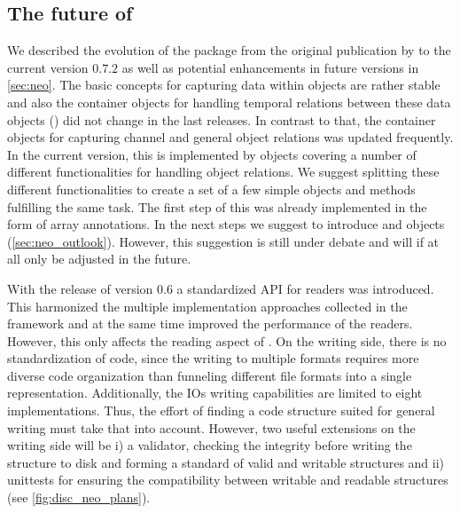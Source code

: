 \subsection{The future of }
We described the evolution of the  package from the original publication by \citet{Garcia_2014} to the current version $0.7.2$ as well as potential enhancements in future versions in \cref{sec:neo}. The basic concepts for capturing data within  objects are rather stable and also the  container objects for handling temporal relations between these data objects () did not change in the last releases. In contrast to that, the container objects for capturing channel and general object relations was updated frequently. In the current  version, this is implemented by  objects covering a number of different functionalities for handling object relations. We suggest splitting these different functionalities to create a set of a few simple objects and methods fulfilling the same task. The first step of this was already implemented in the form of array annotations. In the next steps we suggest to introduce  and  objects (\cref{sec:neo_outlook}). However, this suggestion is still under debate and will if at all only be adjusted in the future. 

With the release of  version $0.6$ a standardized API for readers was introduced. This harmonized the multiple implementation approaches collected in the  framework and at the same time improved the performance of the readers. However, this only affects the reading aspect of . On the writing side, there is no standardization of code, since the writing to multiple formats requires more diverse code organization than funneling different file formats into a single representation. Additionally,  the IOs writing capabilities are limited to eight implementations.  Thus, the effort of finding a code structure suited for general writing must take that into account. However, two useful extensions on the writing side will be i) a validator, checking the integrity before writing the  structure to disk and forming a standard of valid and writable  structures and ii) unittests for ensuring the compatibility between writable and readable  structures (see \cref{fig:disc_neo_plans}).

